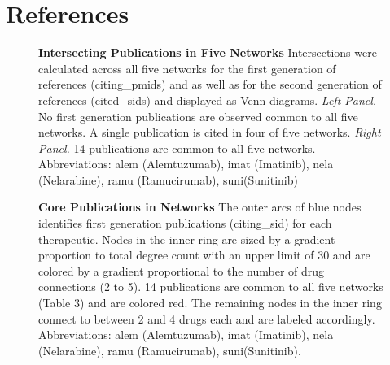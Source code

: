 \documentclass[review]{elsarticle}
\begin{document}
\section*{References}

 

\begin{figure}[!h]
\centering
\scalebox{0.99}
{
\begin{subfigure}{.5\textwidth}
  \centering
  \label{fig:sub1}
\end{subfigure}
\begin{subfigure}{.5\textwidth}
  \centering
  \label{fig:sub2}
\end{subfigure}
}
\caption{{\bf Intersecting Publications in Five Networks} Intersections were calculated across all five networks for the first generation of references (citing\_pmids) and 
as well as for the second generation of references (cited\_sids) and displayed as Venn diagrams. \emph{Left Panel.} No first generation publications are observed common to all five networks. A single publication is cited in four of five networks. \emph{Right Panel.} 14  publications are common to all five networks. Abbreviations: alem (Alemtuzumab), imat (Imatinib), nela (Nelarabine), ramu (Ramucirumab), suni(Sunitinib)}
\label{fig: test}
\end{figure}

\begin{figure}[!h]
\centering
\caption{{\bf Core Publications in Networks}  The outer arcs of blue nodes identifies first generation publications (citing\_sid) for each therapeutic. Nodes in the inner ring are sized by a gradient proportion to total degree count with an upper limit of 30 and are colored by a gradient proportional to the number of drug connections (2 to 5). 14  publications are common to all five networks (Table 3) and are colored red. The remaining nodes in the inner ring connect to between 2 and 4 drugs each and are labeled accordingly. Abbreviations: alem (Alemtuzumab), imat (Imatinib), nela (Nelarabine), ramu (Ramucirumab), suni(Sunitinib).}
\label{fig2}
\end{figure}
\end{document}
